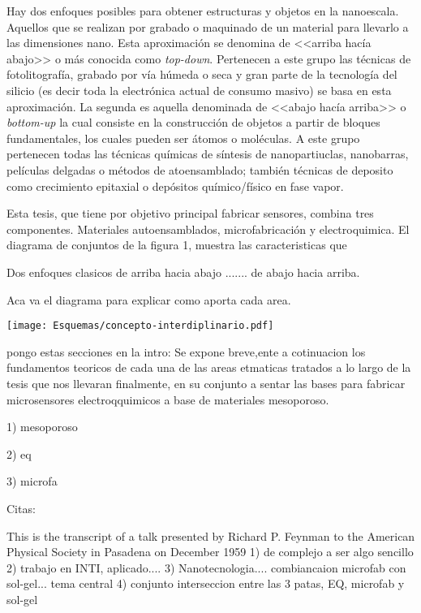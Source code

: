 Hay dos enfoques posibles para obtener estructuras y objetos en la nanoescala. Aquellos que se realizan por grabado o maquinado de un material para llevarlo a las dimensiones nano. Esta aproximación se denomina de <<arriba hacía abajo>> o más conocida como \textit{top-down}. Pertenecen a este grupo las técnicas de fotolitografía, grabado por vía húmeda o seca y gran parte de la tecnología del silicio (es decir toda la electrónica actual de consumo masivo) se basa en esta aproximación. La segunda es aquella denominada de <<abajo hacía arriba>> o \textit{bottom-up} la cual consiste en la construcción de objetos a partir de bloques fundamentales, los cuales pueden ser átomos o moléculas. A este grupo pertenecen todas las técnicas químicas de síntesis de nanopartiuclas, nanobarras, películas delgadas o métodos de atoensamblado; también técnicas de deposito como crecimiento epitaxial o depósitos químico/físico en fase vapor.

Esta tesis, que tiene por objetivo principal fabricar sensores, combina tres componentes. Materiales autoensamblados, microfabricación y electroquimica. 
El diagrama de conjuntos de la figura 1, muestra las caracteristicas que 

Dos enfoques clasicos de arriba hacia abajo ....... de abajo hacia arriba.

Aca va el diagrama para explicar como aporta cada area.


\begin{center}
	\texttt{[image: Esquemas/concepto-interdiplinario.pdf]}
\end{center}

 
pongo estas secciones en la intro:
Se expone breve,ente a cotinuacion los fundamentos teoricos de cada una de las areas etmaticas tratados a lo largo de la tesis que nos llevaran finalmente, en su conjunto a sentar las bases para fabricar microsensores electroqquimicos a base de materiales mesoporoso.

1) mesoporoso

2) eq

3) microfa

Citas:


This is the transcript of a talk presented by Richard P. Feynman to the American Physical Society
in Pasadena on December 1959
1) de complejo a ser algo sencillo \\
2) trabajo en INTI, aplicado....
3) Nanotecnologia.... combiancaion microfab con sol-gel... tema central
4) conjunto interseccion entre las 3 patas, EQ, microfab y sol-gel

